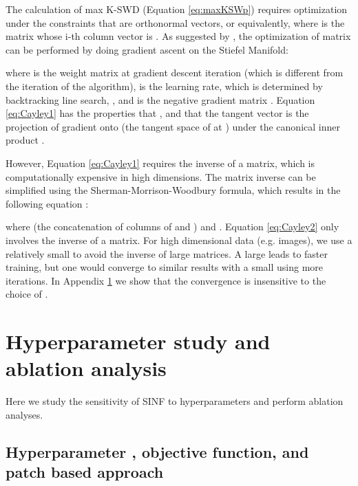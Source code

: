 \documentclass{article}
\begin{document}
The calculation of max K-SWD (Equation \ref{eq:maxKSWp}) requires optimization under the constraints that  are orthonormal vectors, or equivalently,  where  is the matrix whose i-th column vector is . As suggested by \citet{tagare2011notes}, the optimization of matrix  can be performed by doing gradient ascent on the Stiefel Manifold:

where  is the weight matrix at gradient descent iteration  (which is different from the iteration  of the algorithm),  is the learning rate, which is determined by backtracking line search, , and  is the negative gradient matrix . Equation \ref{eq:Cayley1} has the properties that , and that the tangent vector  is the projection of gradient  onto  (the tangent space of  at ) under the canonical inner product \citep{tagare2011notes}. 

However, Equation \ref{eq:Cayley1} requires the inverse of a  matrix, which is computationally expensive in high dimensions. The matrix inverse can be simplified using the Sherman-Morrison-Woodbury formula, which results in the following equation \citep{tagare2011notes}:

where  (the concatenation of columns of  and ) and . Equation \ref{eq:Cayley2} only involves the inverse of a  matrix. For high dimensional data (e.g. images), we use a relatively small  to avoid the inverse of large matrices. A large  leads to faster training, but one would converge to similar results with a small  using more iterations. In Appendix \ref{sec:ablation} we show that the convergence is insensitive to the choice of .

\section{Hyperparameter study and ablation analysis}
\label{sec:ablation}
Here we study the sensitivity of SINF to hyperparameters and perform 
ablation analyses. 
\subsection{Hyperparameter , objective function, and patch based approach}
\end{document}
